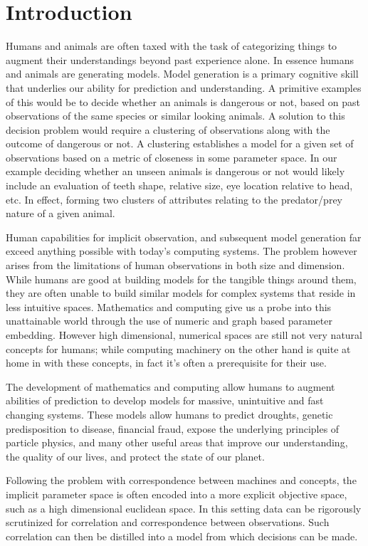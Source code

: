\chapter{Introduction}

Humans and animals are often taxed with the task of categorizing things to augment their understandings beyond past
experience alone.  In essence humans and animals are generating models.  Model generation is a primary cognitive skill
that underlies our ability for prediction and understanding.  A primitive examples of this would be to decide whether an
animals is dangerous or not, based on past observations of the same species or similar looking animals.  A solution to
this decision problem would require a clustering of observations along with the outcome of dangerous or not.  A
clustering establishes a model for a given set of observations based on a metric of closeness in some parameter space.
In our example deciding whether an unseen animals is dangerous or not would likely include an evaluation of teeth shape,
relative size, eye location relative to head, etc.  In effect, forming two clusters of attributes relating to the
predator/prey nature of a given animal.

Human capabilities for implicit observation, and subsequent model generation far exceed anything possible with today's
computing systems.  The problem however arises from the limitations of human observations in both size and dimension.
While humans are good at building models for the tangible things around them, they are often unable to build similar
models for complex systems that reside in less intuitive spaces.  Mathematics and computing give us a probe into this
unattainable world through the use of numeric and graph based parameter embedding.  However high dimensional, numerical
spaces are still not very natural concepts for humans; while computing machinery on the other hand is quite at home in
with these concepts, in fact it's often a prerequisite for their use.

The development of mathematics and computing allow humans to augment abilities of prediction to develop models for
massive, unintuitive and fast changing systems.  These models allow humans to predict droughts, genetic predisposition
to disease, financial fraud, expose the underlying principles of particle physics, and many other useful areas that
improve our understanding, the quality of our lives, and protect the state of our planet.

Following the problem with correspondence between machines and concepts, the implicit parameter space is often encoded
into a more explicit objective space, such as a high dimensional euclidean space.  In this setting data can be
rigorously scrutinized for correlation and correspondence between observations.  Such correlation can then be distilled
into a model from which decisions can be made.

